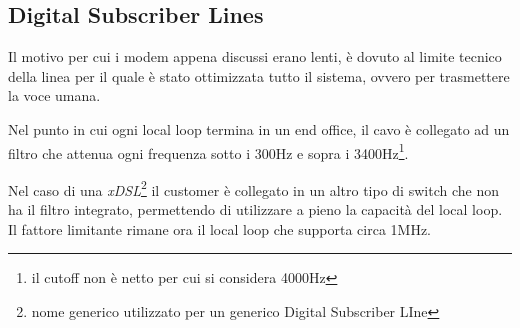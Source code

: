 \documentclass[../ComputerNetworks.tex]{subfiles}
\begin{document}
\subsection{Digital Subscriber Lines}

Il motivo per cui i modem appena discussi erano lenti, è dovuto al limite tecnico della linea per il quale è stato ottimizzata tutto il sistema, ovvero per trasmettere la voce umana.

Nel punto in cui ogni local loop termina in un end office, il cavo è collegato ad un filtro che attenua ogni frequenza sotto i 300Hz e sopra i 3400Hz\footnote{il cutoff non è netto per cui si considera 4000Hz}.

Nel caso di una \emph{xDSL}\footnote{nome generico utilizzato per un generico Digital Subscriber LIne} il customer è collegato in un altro tipo di switch che non ha il filtro integrato, permettendo di utilizzare a pieno la capacità del local loop.
Il fattore limitante rimane ora il local loop che supporta circa 1MHz.





\biblio
\end{document}
